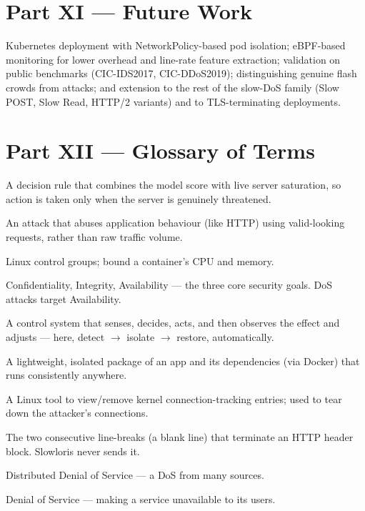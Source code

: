 \documentclass[11pt,a4paper]{article}
\begin{document}
\section{Part XI --- Future Work}
Kubernetes deployment with NetworkPolicy-based pod isolation; eBPF-based monitoring
for lower overhead and line-rate feature extraction; validation on public
benchmarks (CIC-IDS2017, CIC-DDoS2019); distinguishing genuine flash crowds from
attacks; and extension to the rest of the slow-DoS family (Slow POST, Slow Read,
HTTP/2 variants) and to TLS-terminating deployments.

\section{Part XII --- Glossary of Terms}
\begin{description}[leftmargin=0pt,style=nextline]
  \item[Adaptive threshold] A decision rule that combines the model score with live
  server saturation, so action is taken only when the server is genuinely
  threatened.
  \item[Application-layer (Layer-7) attack] An attack that abuses application
  behaviour (like HTTP) using valid-looking requests, rather than raw traffic
  volume.
  \item[cgroups] Linux control groups; bound a container's CPU and memory.
  \item[CIA triad] Confidentiality, Integrity, Availability --- the three core
  security goals. DoS attacks target Availability.
  \item[Closed loop] A control system that senses, decides, acts, and then observes
  the effect and adjusts --- here, detect $\rightarrow$ isolate $\rightarrow$
  restore, automatically.
  \item[Container] A lightweight, isolated package of an app and its dependencies
  (via Docker) that runs consistently anywhere.
  \item[conntrack] A Linux tool to view/remove kernel connection-tracking entries;
  used to tear down the attacker's connections.
  \item[CRLFCRLF] The two consecutive line-breaks (a blank line) that terminate an
  HTTP header block. Slowloris never sends it.
  \item[DDoS] Distributed Denial of Service --- a DoS from many sources.
  \item[DoS] Denial of Service --- making a service unavailable to its users.

\end{description}
\end{document}
